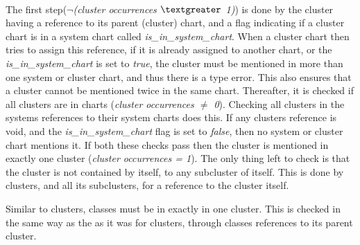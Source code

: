 \paragraph{}
The first step({\footnotesize$\neg$\textit{(cluster occurrences $\textgreater$ 1)}}) is done by the cluster having a reference to its parent (cluster) chart, and a flag indicating if a cluster chart is in a system chart called \textit{is\_in\_system\_chart}. When a cluster chart then tries to assign this reference, if it is already assigned to another chart, or the \textit{is\_in\_system\_chart} is set to \textit{true}, the cluster must be mentioned in more than one system or cluster chart, and thus there is a type error. This also ensures that a cluster cannot be mentioned twice in the same chart. Thereafter, it is checked if all clusters are in charts ({\footnotesize\textit{cluster occurrences $\neq$ 0}}). Checking all clusters in the systems references to their system charts does this. If any clusters reference is void, and the \textit{is\_in\_system\_chart} flag is set to \textit{false}, then no system or cluster chart mentions it. If both these checks pass then the cluster is mentioned in exactly one cluster ({\footnotesize\textit{cluster occurrences = 1}}). The only thing left to check is that the cluster is not contained by itself, to any subcluster of itself. This is done by clusters, and all its subclusters, for a reference to the cluster itself.

Similar to clusters, classes must be in exactly in one cluster. This is checked in the same way as the as it was for clusters, through classes references to its parent cluster.